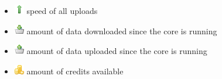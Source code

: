 \documentclass[a4paper,10pt]{book}
\begin{document}
\begin{enumerate}
\begin{itemize}
  \item \includegraphics[width=16px]{../small/arrow_up.png} speed of all uploads
  \item \includegraphics[width=16px]{../small/basket_put.png} amount of data downloaded since the core is running
  \item \includegraphics[width=16px]{../small/basket_remove.png} amount of data uploaded since the core is running
  \item \includegraphics[width=16px]{../small/coins.png} amount of credits available
 \end{itemize}

\end{enumerate}

\end{document}
